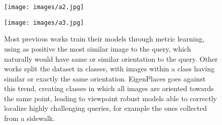 \documentclass[10pt,twocolumn,letterpaper]{article}
\begin{document}
\begin{figure}
    \begin{center}
    \begin{minipage}{.48\textwidth}
        \texttt{[image: images/a2.jpg]}
    \end{minipage}
    \begin{minipage}{.48\textwidth}
    \texttt{[image: images/a3.jpg]}
    \end{minipage}
    \end{center}
    \caption{
Most previous works \cite{Arandjelovic_2018_netvlad, Liu_2019_sare, Kim_2017_crn, Zhang_2021_gated_netvlad} train their models through metric learning, using as positive the most similar image to the query, which naturally would have same or similar orientation to the query. Other works split the dataset in classes, with images within a class having similar \cite{Alibey_2022_gsvcities, Alibey_2023_mixvpr} or exactly the same \cite{Berton_2022_cosPlace} orientation.
    EigenPlaces goes against this trend, creating classes in which all images are oriented towards the same point, leading to viewpoint robust models able to correctly localize highly challenging queries, for example the ones collected from a sidewalk.}
    \label{fig:teaser}
\end{figure}
 
\end{document}
